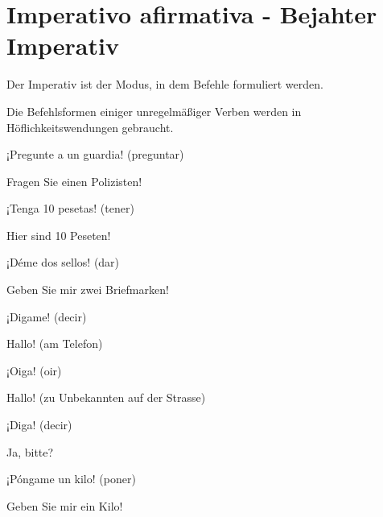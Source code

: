 \section*{Imperativo afirmativa - Bejahter Imperativ}

\begin{highlight}
Der Imperativ ist der Modus, in dem Befehle formuliert werden.
\end{highlight}


Die Befehlsformen einiger unregelmäßiger Verben werden in Höflichkeitswendungen gebraucht.

\begin{compactitem}
    \item  ¡Pregunte a un guardia! (preguntar)
        \begin{compactitem}\itshape \item Fragen Sie einen Polizisten!\end{compactitem}
    \item  ¡Tenga 10 pesetas! (tener)
        \begin{compactitem}\itshape \item Hier sind 10 Peseten!\end{compactitem}
    \item  ¡Déme dos sellos! (dar)
        \begin{compactitem}\itshape \item Geben Sie mir zwei Briefmarken!\end{compactitem}
    \item  ¡Digame! (decir)
        \begin{compactitem}\itshape \item Hallo! (am Telefon)\end{compactitem}
    \item  ¡Oiga! (oir)
        \begin{compactitem}\itshape \item Hallo! (zu Unbekannten auf der Strasse)\end{compactitem}
    \item  ¡Diga! (decir)
        \begin{compactitem}\itshape \item Ja, bitte?\end{compactitem}
    \item  ¡Póngame un kilo! (poner)
        \begin{compactitem}\itshape \item   Geben Sie mir ein Kilo!\end{compactitem}

\end{compactitem}
